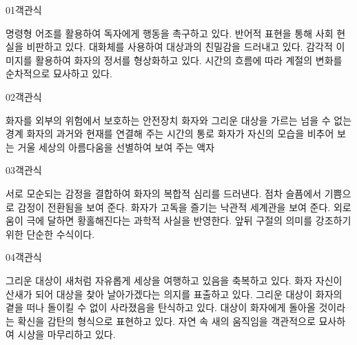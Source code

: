 \documentclass[fs85,seriesWit]{korfarm-base}
\begin{document}
\kfBeginMC
\begin{kfQBlock}{01}{객관식}
\begin{kfChoices}
\kfChoice 명령형 어조를 활용하여 독자에게 행동을 촉구하고 있다.
\kfChoice 반어적 표현을 통해 사회 현실을 비판하고 있다.
\kfChoice 대화체를 사용하여 대상과의 친밀감을 드러내고 있다.
\kfChoice 감각적 이미지를 활용하여 화자의 정서를 형상화하고 있다.
\kfChoice 시간의 흐름에 따라 계절의 변화를 순차적으로 묘사하고 있다.
\end{kfChoices}
\end{kfQBlock}

\begin{kfQBlock}{02}{객관식}
\begin{kfChoices}
\kfChoice 화자를 외부의 위험에서 보호하는 안전장치
\kfChoice 화자와 그리운 대상을 가르는 넘을 수 없는 경계
\kfChoice 화자의 과거와 현재를 연결해 주는 시간의 통로
\kfChoice 화자가 자신의 모습을 비추어 보는 거울
\kfChoice 세상의 아름다움을 선별하여 보여 주는 액자
\end{kfChoices}
\end{kfQBlock}

\begin{kfQBlock}{03}{객관식}
\begin{kfChoices}
\kfChoice 서로 모순되는 감정을 결합하여 화자의 복합적 심리를 드러낸다.
\kfChoice 점차 슬픔에서 기쁨으로 감정이 전환됨을 보여 준다.
\kfChoice 화자가 고독을 즐기는 낙관적 세계관을 보여 준다.
\kfChoice 외로움이 극에 달하면 황홀해진다는 과학적 사실을 반영한다.
\kfChoice 앞뒤 구절의 의미를 강조하기 위한 단순한 수식이다.
\end{kfChoices}
\end{kfQBlock}

\begin{kfQBlock}{04}{객관식}
\begin{kfChoices}
\kfChoice 그리운 대상이 새처럼 자유롭게 세상을 여행하고 있음을 축복하고 있다.
\kfChoice 화자 자신이 산새가 되어 대상을 찾아 날아가겠다는 의지를 표출하고 있다.
\kfChoice 그리운 대상이 화자의 곁을 떠나 돌이킬 수 없이 사라졌음을 탄식하고 있다.
\kfChoice 대상이 화자에게 돌아올 것이라는 확신을 감탄의 형식으로 표현하고 있다.
\kfChoice 자연 속 새의 움직임을 객관적으로 묘사하여 시상을 마무리하고 있다.
\end{kfChoices}
\end{kfQBlock}
\end{document}
